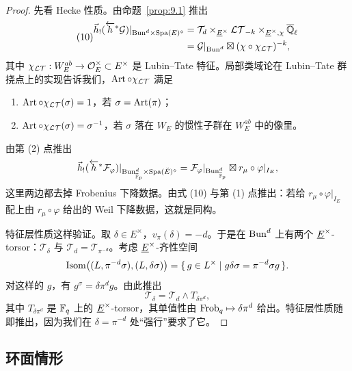 \begin{proof}
先看 Hecke 性质。由命题~\ref{prop:9.1} 推出
\begin{equation}\tag{10}\label{eq:9.10}
\begin{aligned}
\vec{h}_!(\overleftarrow{h}^* \mathcal{G})|_{\mathrm{Bun}^d \times \mathrm{Spa}(E)^\diamond}
&= \mathcal{T}_d \times_{\underline{E}^\times} \mathcal{LT}_{-k} \times_{\underline{E}^\times,\chi} \overline{\mathbb{Q}}_\ell \\
&= \mathcal{G}|_{\mathrm{Bun}^d} \boxtimes (\chi \circ \chi_{\mathcal{LT}})^{-k},
\end{aligned}
\end{equation}
其中 $\chi_{\mathcal{LT}} : W_E^{ab} \to \mathcal{O}_E^\times \subset E^\times$ 是 Lubin–Tate 特征。局部类域论在 Lubin–Tate 群挠点上的实现告诉我们，$\operatorname{Art} \circ \chi_{\mathcal{LT}}$ 满足
\begin{enumerate}[label=(\arabic*),leftmargin=*]
\item $\operatorname{Art} \circ \chi_{\mathcal{LT}}(\sigma) = 1$，若 $\sigma = \operatorname{Art}(\pi)$；
\item $\operatorname{Art} \circ \chi_{\mathcal{LT}}(\sigma) = \sigma^{-1}$，若 $\sigma$ 落在 $W_E$ 的惯性子群在 $W_E^{ab}$ 中的像里。
\end{enumerate}
由第 (2) 点推出
\[
\vec{h}_!(\overleftarrow{h}^* \mathcal{F}_\varphi)|_{\mathrm{Bun}^d_{\overline{\mathbb{F}}_p} \times \mathrm{Spa}(\breve{E})^\diamond}
= \mathcal{F}_\varphi|_{\mathrm{Bun}^d_{\overline{\mathbb{F}}_p}} \boxtimes r_\mu \circ \varphi|_{I_E},
\]
这里两边都去掉 Frobenius 下降数据。由式 (10) 与第 (1) 点推出：若给 $r_\mu \circ \varphi|_{I_E}$ 配上由 $r_\mu \circ \varphi$ 给出的 Weil 下降数据，这就是同构。

特征层性质这样验证。取 $\delta \in E^\times$，$v_\pi(\delta) = -d$。于是在 $\mathrm{Bun}^d$ 上有两个 $\underline{E}^\times$-torsor：$\mathcal{T}_\delta$ 与 $\mathcal{T}_d = \mathcal{T}_{\pi^{-d}}$。考虑 $\underline{E}^\times$-齐性空间
\[
\operatorname{Isom}\bigl((L, \pi^{-d}\sigma), (L, \delta\sigma)\bigr)
= \{\, g \in L^\times \mid g\delta\sigma = \pi^{-d}\sigma g \,\}.
\]
对这样的 $g$，有 $g^\sigma = \delta\pi^d g$。由此推出
\[
\mathcal{T}_\delta = \mathcal{T}_d \wedge T_{\delta\pi^d},
\]
其中 $T_{\delta\pi^d}$ 是 $\mathbb{F}_q$ 上的 $\underline{E}^\times$-torsor，其单值性由 $\operatorname{Frob}_q \mapsto \delta\pi^d$ 给出。特征层性质随即推出，因为我们在 $\delta = \pi^{-d}$ 处“强行”要求了它。
\end{proof}

\subsection{环面情形}%

